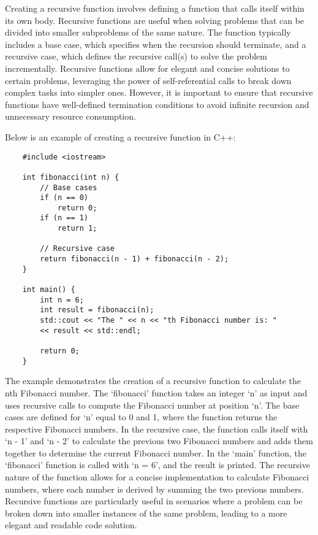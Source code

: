 Creating a recursive function involves defining a function that calls itself within its own body. Recursive functions are useful when solving problems that can be divided into smaller subproblems of the same nature. The function typically includes a base case, which specifies when the recursion should terminate, and a recursive 
case, which defines the recursive call(s) to solve the problem incrementally. Recursive functions allow for elegant and concise solutions to certain problems, leveraging the power of self-referential calls to break down complex tasks into simpler ones. However, it is important to ensure that recursive functions have well-defined 
termination conditions to avoid infinite recursion and unnecessary resource consumption.

\begin{solution}
    Below is an example of creating a recursive function in C++:

    \horizontalline

    \begin{verbatim}
    #include <iostream>

    int fibonacci(int n) {
        // Base cases
        if (n == 0)
            return 0;
        if (n == 1)
            return 1;
    
        // Recursive case
        return fibonacci(n - 1) + fibonacci(n - 2);
    }
    
    int main() {
        int n = 6;
        int result = fibonacci(n);
        std::cout << "The " << n << "th Fibonacci number is: " 
        << result << std::endl;
    
        return 0;
    }
    \end{verbatim}

    \horizontalline

    The example demonstrates the creation of a recursive function to calculate the nth Fibonacci number. The `fibonacci' function takes an integer `n' as input and uses recursive calls to compute the Fibonacci number at position `n'. The base cases are defined for `n' equal to 0 and 1, where the function returns the respective Fibonacci 
    numbers. In the recursive case, the function calls itself with `n - 1' and `n - 2' to calculate the previous two Fibonacci numbers and adds them together to determine the current Fibonacci number. In the `main' function, the `fibonacci' function is called with `n = 6', and the result is printed. The recursive nature of the function 
    allows for a concise implementation to calculate Fibonacci numbers, where each number is derived by summing the two previous numbers. Recursive functions are particularly useful in scenarios where a problem can be broken down into smaller instances of the same problem, leading to a more elegant and readable code solution.
\end{solution}

